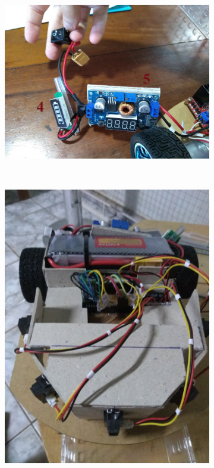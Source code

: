 \begin{figure}[!ht]
\begin{subfigure}[b]{0.49\textwidth}
		\includegraphics[trim= 0cm 0cm 0cm 0cm,clip,
scale=0.03]{Figuras/RoboMontagem3}%
	\end{subfigure}%
	~
	\begin{subfigure}[b]{0.49\textwidth}%
		\centering
		\includegraphics[trim={0cm 0cm 0cm 0cm},clip,
scale=0.03]{Figuras/RoboMontagem4}%
	\end{subfigure}%
\end{figure}